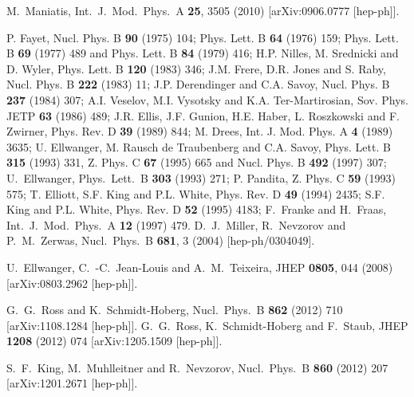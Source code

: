 \documentclass[final,3p,times,pdflatex]{elsarticle}
\begin{document}
\begin{thebibliography}{10}
  M.~Maniatis,
  Int.\ J.\ Mod.\ Phys.\ A {\bf 25}, 3505 (2010)
  [arXiv:0906.0777 [hep-ph]].


 P. Fayet, Nucl. Phys. B \textbf{90} (1975) 104; Phys. Lett.
B \textbf{64} (1976) 159; Phys. Lett. B \textbf{69} (1977) 489 and Phys. Lett. B
\textbf{84} (1979) 416; H.P. Nilles, M. Srednicki and D. Wyler, Phys. Lett. B
\textbf{120} (1983) 346; J.M. Frere, D.R. Jones and S. Raby, Nucl. Phys. B
\textbf{222} (1983) 11; J.P. Derendinger and C.A. Savoy, Nucl. Phys. B
\textbf{237} (1984) 307;  A.I. Veselov, M.I. Vysotsky and K.A. Ter-Martirosian,
Sov. Phys. JETP \textbf{63} (1986) 489; J.R. Ellis, J.F. Gunion, H.E. Haber, L.
Roszkowski and F. Zwirner, Phys. Rev. D \textbf{39}  (1989) 844; M. Drees, Int.
J. Mod. Phys. A \textbf{4}  (1989) 3635; U. Ellwanger, M. Rausch de
Traubenberg and C.A. Savoy, Phys. 
Lett. B \textbf{315} (1993) 331, Z. Phys. C {\bf 67} (1995) 665 and Nucl. Phys.
B \textbf{492} (1997) 307; U.~Ellwanger, Phys.\ Lett.\  B {\bf 303} (1993) 271; P.
Pandita, Z. Phys. C \textbf{59} (1993) 575; T. Elliott, S.F. King and P.L.
White, Phys. Rev. D {\bf 49} (1994) 2435; S.F. King and P.L. White, Phys. Rev. D
\textbf{52} (1995) 4183;  F.~Franke and H.~Fraas, Int.\ J.\ Mod.\ Phys.\  A {\bf
12} (1997) 479.   D.~J.~Miller, R.~Nevzorov and P.~M.~Zerwas,  Nucl.\ Phys.\ B {\bf 681}, 3 (2004) [hep-ph/0304049].

  U.~Ellwanger, C.~-C.~Jean-Louis and A.~M.~Teixeira,
  JHEP {\bf 0805}, 044 (2008)
  [arXiv:0803.2962 [hep-ph]].


  G.~G.~Ross and K.~Schmidt-Hoberg,
  Nucl.\ Phys.\ B {\bf 862} (2012) 710
  [arXiv:1108.1284 [hep-ph]].
  G.~G.~Ross, K.~Schmidt-Hoberg and F.~Staub,
  JHEP {\bf 1208} (2012) 074
  [arXiv:1205.1509 [hep-ph]].

  S.~F.~King, M.~Muhlleitner and R.~Nevzorov,
  Nucl.\ Phys.\ B {\bf 860} (2012) 207
  [arXiv:1201.2671 [hep-ph]].


\end{thebibliography}
\end{document}
